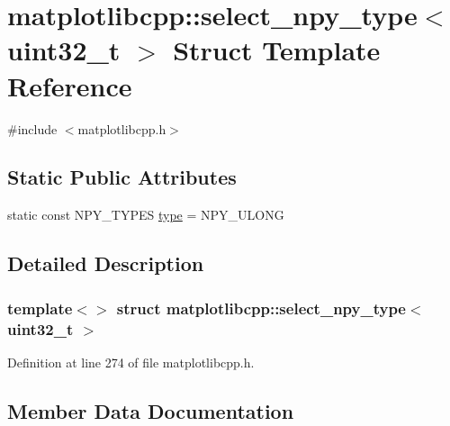 \hypertarget{structmatplotlibcpp_1_1select__npy__type_3_01uint32__t_01_4}{}\section{matplotlibcpp\+::select\+\_\+npy\+\_\+type$<$ uint32\+\_\+t $>$ Struct Template Reference}
\label{structmatplotlibcpp_1_1select__npy__type_3_01uint32__t_01_4}


{\ttfamily \#include $<$matplotlibcpp.\+h$>$}

\subsection*{Static Public Attributes}
\begin{DoxyCompactItemize}
\item 
static const N\+P\+Y\+\_\+\+T\+Y\+P\+ES \mbox{\hyperlink{structmatplotlibcpp_1_1select__npy__type_3_01uint32__t_01_4_a21b0fbd17b661ef512cc1c3c728dfa60}{type}} = N\+P\+Y\+\_\+\+U\+L\+O\+NG
\end{DoxyCompactItemize}


\subsection{Detailed Description}
\subsubsection*{template$<$$>$\newline
struct matplotlibcpp\+::select\+\_\+npy\+\_\+type$<$ uint32\+\_\+t $>$}



Definition at line 274 of file matplotlibcpp.\+h.



\subsection{Member Data Documentation}
\mbox{\label{structmatplotlibcpp_1_1select__npy__type_3_01uint32__t_01_4_a21b0fbd17b661ef512cc1c3c728dfa60}} 
